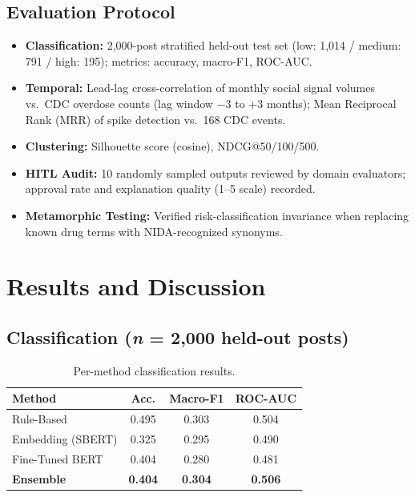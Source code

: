 \documentclass[10pt,twocolumn]{article}
\begin{document}
\subsection*{Evaluation Protocol}
\begin{itemize}[leftmargin=*, noitemsep, topsep=2pt]
  \item \textbf{Classification:} 2,000-post stratified held-out test set
        (low: 1,014 / medium: 791 / high: 195); metrics: accuracy, macro-F1, ROC-AUC.
  \item \textbf{Temporal:} Lead-lag cross-correlation of monthly social signal volumes vs.\
        CDC overdose counts (lag window $-3$ to $+3$ months);
        Mean Reciprocal Rank (MRR) of spike detection vs.\ 168 CDC events.
  \item \textbf{Clustering:} Silhouette score (cosine), NDCG@50/100/500.
  \item \textbf{HITL Audit:} 10 randomly sampled outputs reviewed by domain evaluators;
        approval rate and explanation quality (1--5 scale) recorded.
  \item \textbf{Metamorphic Testing:} Verified risk-classification invariance when replacing
        known drug terms with NIDA-recognized synonyms.
\end{itemize}

\section{Results and Discussion}

\subsection*{Classification (\textit{n} = 2,000 held-out posts)}

\begin{table}[H]
\centering
\caption{Per-method classification results.}
\label{tab:clf}
\scriptsize
\begin{tabular}{@{}lccc@{}}
  \toprule
  \textbf{Method} & \textbf{Acc.} & \textbf{Macro-F1} & \textbf{ROC-AUC} \\
  \midrule
  Rule-Based              & 0.495 & 0.303 & 0.504 \\
  Embedding (SBERT)       & 0.325 & 0.295 & 0.490 \\
  Fine-Tuned BERT         & 0.404 & 0.280 & 0.481 \\
  \textbf{Ensemble}       & \textbf{0.404} & \textbf{0.304} & \textbf{0.506} \\
  \bottomrule
\end{tabular}
\end{table}
\end{document}
